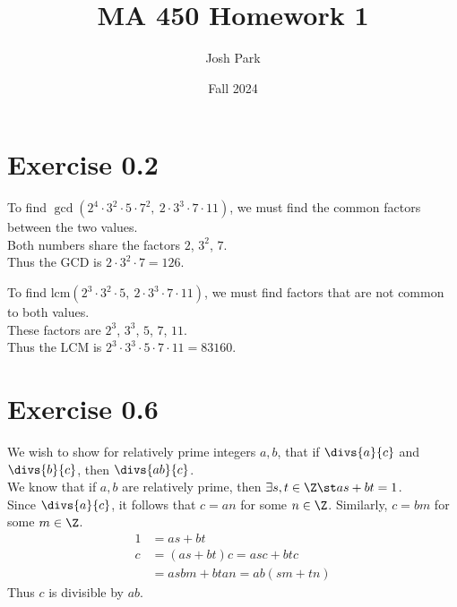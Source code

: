 \documentclass{article}
\author{Josh Park}
\date{\vspace*{-1em}Fall 2024}
\title{\vspace*{-2em}MA 450 Homework 1 \vspace*{-1em}}
\begin{document}
\maketitle
\section*{Exercise 0.2}
To find \(\gcd(2^4\cdot 3^2\cdot 5\cdot 7^2,\ 2\cdot 3^3\cdot 7\cdot 11)\), we must find the common factors between the two values. \\
Both numbers share the factors \(2\), \(3^2\), \(7\). \\
Thus the GCD is \(2\cdot 3^2\cdot 7=126\).

To find \(\text{lcm}(2^3\cdot 3^2\cdot 5,\ 2\cdot 3^3\cdot 7\cdot 11)\), we must find factors that are not common to both values. \\
These factors are \(2^3\), \(3^3\), \(5\), \(7\), \(11\). \\
Thus the LCM is \(2^3\cdot 3^3\cdot 5\cdot 7\cdot 11=83160\).

\section*{Exercise 0.6}
We wish to show for relatively prime integers \(a, b\), that  if \(\divs{a}{c}\) and \(\divs{b}{c}\), then \(\divs{ab}{c}\). \\
We know that if \(a,b\) are relatively prime, then \(\exists s,t \in \Z \st as+bt=1\). \\
Since \(\divs{a}{c}\), it follows that \(c=an\) for some \(n\in\Z\). Similarly, \(c=bm\) for some \(m\in\Z\).
\begin{align}
    1 &= as + bt  \\
    c &= (as + bt)c = asc + btc \\
    &= asbm + btan = ab(sm + tn)
\end{align}
Thus \(c\) is divisible by \(ab\).
\end{document}
